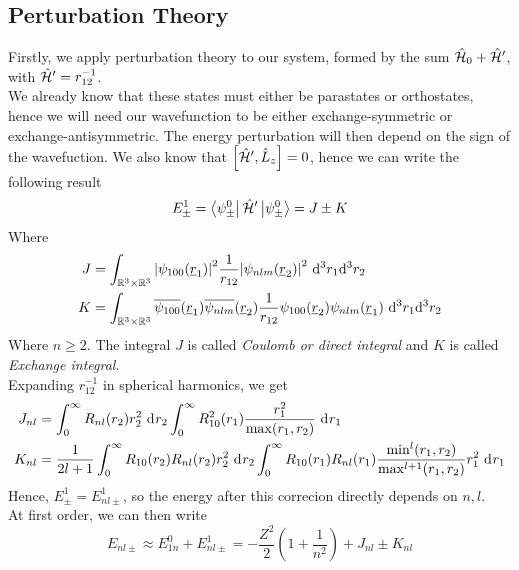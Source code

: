 \documentclass[../qm.tex]{subfiles}
\begin{document}
	\subsection{Perturbation Theory}
	Firstly, we apply perturbation theory to our system, formed by the sum $\hat{\mathcal{H}}_0+\hat{\mathcal{H}}'$, with $\hat{\mathcal{H}}'=r_{12}^{-1}$.\\
	We already know that these states must either be parastates or orthostates, hence we will need our wavefunction to be either exchange-symmetric or exchange-antisymmetric. The energy perturbation will then depend on the sign of the wavefuction. We also know that $\comm{\opr{\ham}'}{\opr{L}_z}=0$, hence we can write the following result
	\begin{equation}
		E_{\pm}^1=\bra{\psi^0_{\pm}}\opr{\ham}'\ket{\psi^0_{\pm}}=J\pm K
		\label{eq:energyplusminusexcited}
	\end{equation}
	Where
	\begin{equation}
		\begin{aligned}
			J&=\int_{\mathbb{R}^3\times\mathbb{R}^3}\abs{\psi_{100}(\vec{r}_1)}^2\frac{1}{r_{12}}\abs{\psi_{nlm}(\vec{r}_2)}^2\ddiff[3]{r_1}{r_2}\\
			K&=\int_{\mathbb{R}^3\times\mathbb{R}^3}\cc{\psi_{100}}(\vec{r}_1)\cc{\psi_{nlm}}(\vec{r}_2)\frac{1}{r_{12}}\psi_{100}(\vec{r}_2)\psi_{nlm}(\vec{r}_1)\ddiff[3]{r_1}{r_2}
		\end{aligned}
		\label{eq:jkintegrals}
	\end{equation}
	Where $n\ge2$. The integral $J$ is called \textit{Coulomb or direct integral} and $K$ is called \textit{Exchange integral}.\\
	Expanding $r_{12}^{-1}$ in spherical harmonics, we get
	\begin{equation}
		\begin{aligned}
			J_{nl}&=\int_{0}^{\infty}R_{nl}(r_2)r_2^2\diff{r_2}\int_{0}^{\infty}R_{10}^2(r_1)\frac{r_1^2}{\max(r_1,r_2)}\diff{r_1}\\
			K_{nl}&=\frac{1}{2l+1}\int_{0}^{\infty}R_{10}(r_2)R_{nl}(r_2)r^2_2\diff{r_2}\int_{0}^{\infty}R_{10}(r_1)R_{nl}(r_1)\frac{\min^l(r_1,r_2)}{\max^{l+1}(r_1,r_2)}r_1^2\diff{r_1}
		\end{aligned}
		\label{eq:jkcompleteshexpansion}
	\end{equation}
	Hence, $E_{\pm}^1=E_{nl\pm}^1$, so the energy after this correcion directly depends on $n,l$.\\
	At first order, we can then write
	\begin{equation}
		E_{nl\pm}\approx E_{1n}^0+E_{nl\pm}^1=-\frac{Z^2}{2}\left( 1+\frac{1}{n^2} \right)+J_{nl}\pm K_{nl}
		\label{eq:energyshiftjkintegrals}
	\end{equation}
\end{document}
